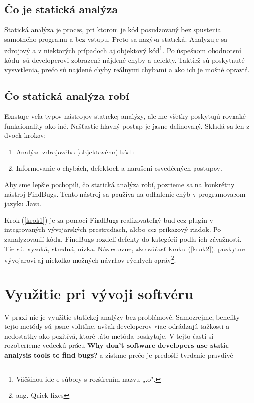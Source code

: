 \documentclass[11pt,twoside,slovak,a4paper]{article}
\begin{document}
\subsection{Čo je statická analýza} \label{principy:co}
Statická analýza je proces, pri ktorom je kód posudzovaný bez spustenia samotného programu a bez vstupu. Preto sa
nazýva statická. Analyzuje sa zdrojový a v niektorých prípadoch aj objektový kód\footnote{Väčšinou ide o súbory s
	rozšírením nazvu „.o".}. Po úspešnom ohodnotení kódu, sú developerovi zobrazené nájdené chyby a defekty. Taktiež sú
poskytnuté vysvetlenia, prečo sú najdené chyby reálnymi chybami a ako ich je možné opraviť.\cite{wiki:Static_program_analysis}

\subsection{Čo statická analýza robí} \label{principy:ako}
Existuje veľa typov nástrojov statickej analýzy, ale nie všetky poskytujú rovnaké funkcionality ako iné. Našťastie
hlavný postup je jasne definovaný. Skladá sa len z dvoch krokov:

\begin{enumerate}
	\item Analýza zdrojového (objektového) kódu. \label{krok1}
	\item Informovanie o chybách, defektoch a narušení osvedčených postupov. \label{krok2}
\end{enumerate}

Aby sme lepšie pochopili, čo statická analýza robí, pozrieme sa na konkrétny nástroj FindBugs. Tento
nástroj sa používa na odhalenie chýb v programovacom jazyku Java.\cite{FindBugs}

Krok (\ref{krok1}) je za pomoci FindBugs realizovateľný buď cez plugin v integrovaných vývojarských prostrediach, alebo
cez príkazový riadok. Po zanalyzovanií kódu, FindBugs rozdelí defekty do kategórií podľa ich závažnosti. Tie sú:
vysoká, stredná, nízka. Následovne, ako súčasť kroku (\ref{krok2}), poskytne vývojarovi aj niekoľko možných návrhov
rýchlych opráv\footnote{ang. Quick fixes}.\cite{BrittanyJohnson,NathanAyewah}


\section{Využitie pri vývoji softvéru} \label{vyuzitie}
V praxi nie je využitie statickej analýzy bez problémové. Samozrejme, benefity tejto metódy sú jasne viditľne, avšak
developerov viac odrádzajú tažkosti a nedostatky ako pozitívá, ktoré táto metóda poskytuje. V tejto časti si
rozoberieme vedeckú prácu \textbf{Why don't software developers use static analysis tools to find bugs?}\cite{BrittanyJohnson}
a zistíme prečo je predošlé tvrdenie pravdivé.
\end{document}
